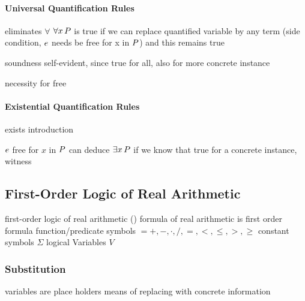                 \paragraph{Universal Quantification Rules}
                    eliminates $\forall$
                    $\forall x{\,} P$ is true if we can replace quantified variable by any term (side condition, $e$ needs be free for x in $P$) and this remains true
                    \begin{calculus}
                    \end{calculus}
                    soundness self-evident, since true for all, also for more concrete instance

                    \begin{example}
                        necessity for free

                    \end{example}

                \paragraph{Existential Quantification Rules}
                    exists introduction
                    \begin{calculus}
                    \end{calculus}
                    $e$ free for $x$ in $P$
                    can deduce $\exists x{\,} P$ if we know that true for a concrete instance, witness


        \subsection{First-Order Logic of Real Arithmetic}
            \label{sec:FOL-R}

            first-order logic of real arithmetic (\FOLR)
            formula of real arithmetic
            is first order formula
            function/predicate symbols $ = {+,-,\cdot,/,=,<,\leq,>,\geq}$
            constant symbols $\Sigma$
            logical Variables $V$


        \subsubsection{Substitution}
        \label{sec:substitution}

        variables are place holders
        means of replacing with concrete information
